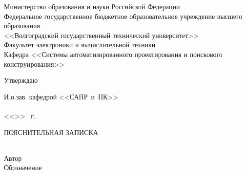 \begin{titlepage}
    \begin{center}
        Министерство образования и науки Российской Федерации \\
        \vspace{.5cm}
        Федеральное государственное бюджетное образовательное учреждение высшего образования\\
        <<Волгоградский государственный технический университет>>\\
        Факультет электроники и вычислительной техники\\
        \vspace{.5cm}
        Кафедра <<Системы автоматизированного проектирования и поискового конструирования>>
        \vspace{.5cm}
    \end{center}
    \begin{flushright}
        \begin{center}
            \hspace*{10.5em}Утверждаю
        \end{center}
        И.о.зав. кафедрой <<САПР~и~ПК>>\\
        \quad{}\\
        <<\underline{\hspace{2em}}>> \underline{\hspace{7.5em}} \the\year\ г.
    \end{flushright}
    \begin{center}
        \large ПОЯСНИТЕЛЬНАЯ ЗАПИСКА\\
            {}\\
        \vspace{5pt}\underline{\hspace{\textwidth}}
        \underline{\hspace{\textwidth}}
    \end{center}
    Автор  \quad 
    \\
    Обозначение 

\end{titlepage}
